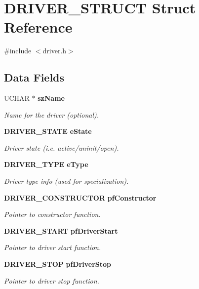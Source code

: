\section{DRIVER\_\-STRUCT Struct Reference}
\label{struct_d_r_i_v_e_r___s_t_r_u_c_t}


{\ttfamily \#include $<$driver.h$>$}\subsection*{Data Fields}
\begin{DoxyCompactItemize}
\item 
UCHAR $\ast$ {\bf szName}
\begin{DoxyCompactList}\small\item\em Name for the driver (optional). \item\end{DoxyCompactList}\item 
{\bf DRIVER\_\-STATE} {\bf eState}
\begin{DoxyCompactList}\small\item\em Driver state (i.e. active/uninit/open). \item\end{DoxyCompactList}\item 
{\bf DRIVER\_\-TYPE} {\bf eType}
\begin{DoxyCompactList}\small\item\em Driver type info (used for specialization). \item\end{DoxyCompactList}\item 
{\bf DRIVER\_\-CONSTRUCTOR} {\bf pfConstructor}
\begin{DoxyCompactList}\small\item\em Pointer to constructor function. \item\end{DoxyCompactList}\item 
{\bf DRIVER\_\-START} {\bf pfDriverStart}
\begin{DoxyCompactList}\small\item\em Pointer to driver start function. \item\end{DoxyCompactList}\item 
{\bf DRIVER\_\-STOP} {\bf pfDriverStop}
\begin{DoxyCompactList}\small\item\em Pointer to driver stop function. \item\end{DoxyCompactList}\item 

\end{DoxyCompactItemize}

